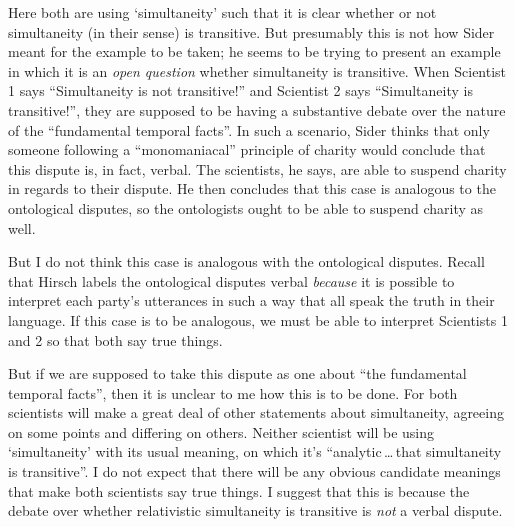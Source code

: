 \documentclass[11pt]{article}
\begin{document}
\begin{spacing}{1.25}





Here both are using `simultaneity' such that it is clear whether or
not simultaneity (in their sense) is transitive.  But presumably this
is not how Sider meant for the example to be taken; he seems to be
trying to present an example in which it is an {\em open question}
whether simultaneity is transitive.  When Scientist 1 says
``Simultaneity is not transitive!'' and Scientist 2 says
``Simultaneity is transitive!'', they are supposed to be having a
substantive debate over the nature of the ``fundamental temporal
facts''.  In such a scenario, Sider thinks that only someone following
a ``monomaniacal'' principle of charity would conclude that this
dispute is, in fact, verbal.  The scientists, he says, are able to
suspend charity in regards to their dispute.  He then concludes that
this case is analogous to the ontological disputes, so the ontologists
ought to be able to suspend charity as well.

But I do not think this case is analogous with the ontological
disputes.  Recall that Hirsch labels the ontological disputes verbal
{\em because} it is possible to interpret each party's utterances in
such a way that all speak the truth in their language.  If this case
is to be analogous, we must be able to interpret Scientists 1 and 2 so
that both say true things.

But if we are supposed to take this dispute as one about ``the
fundamental temporal facts'', then it is unclear to me how this is to
be done.  For both scientists will make a great deal of other
statements about simultaneity, agreeing on some points and differing
on others.  Neither scientist will be using `simultaneity' with its
usual meaning, on which it's ``analytic\,\ldots\,that simultaneity is
transitive''.  I do not expect that there will be any obvious
candidate meanings that make both scientists say true things.  I
suggest that this is because the debate over whether relativistic
simultaneity is transitive is {\em not} a verbal dispute.


\end{spacing}
\end{document}
